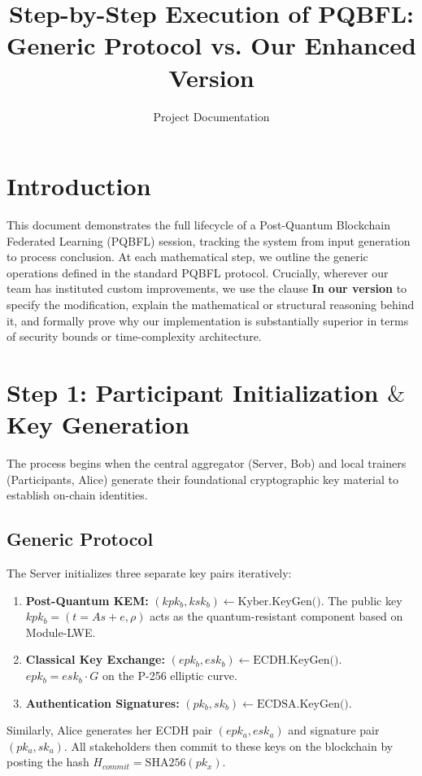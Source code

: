 \documentclass[12pt]{article}
\title{\textbf{Step-by-Step Execution of PQBFL: Generic Protocol vs. Our Enhanced Version}}
\author{Project Documentation}
\date{}
\begin{document}
\maketitle

\section*{Introduction}
This document demonstrates the full lifecycle of a Post-Quantum Blockchain Federated Learning (PQBFL) session, tracking the system from input generation to process conclusion. At each mathematical step, we outline the generic operations defined in the standard PQBFL protocol. Crucially, wherever our team has instituted custom improvements, we use the clause \textbf{In our version} to specify the modification, explain the mathematical or structural reasoning behind it, and formally prove why our implementation is substantially superior in terms of security bounds or time-complexity architecture.

\section*{Step 1: Participant Initialization $\&$ Key Generation}

The process begins when the central aggregator (Server, Bob) and local trainers (Participants, Alice) generate their foundational cryptographic key material to establish on-chain identities.

\subsection*{Generic Protocol}
The Server initializes three separate key pairs iteratively:
\begin{enumerate}
    \item \textbf{Post-Quantum KEM:} $(kpk_b, ksk_b) \leftarrow \text{Kyber.KeyGen()}$. The public key $kpk_b = (t = As + e, \rho)$ acts as the quantum-resistant component based on Module-LWE. 
    \item \textbf{Classical Key Exchange:} $(epk_b, esk_b) \leftarrow \text{ECDH.KeyGen()}$. $epk_b = esk_b \cdot G$ on the P-256 elliptic curve.
    \item \textbf{Authentication Signatures:} $(pk_b, sk_b) \leftarrow \text{ECDSA.KeyGen()}$.
\end{enumerate}
Similarly, Alice generates her ECDH pair $(epk_a, esk_a)$ and signature pair $(pk_a, sk_a)$. All stakeholders then commit to these keys on the blockchain by posting the hash $H_{commit} = \text{SHA256}(pk_x)$.
\end{document}
